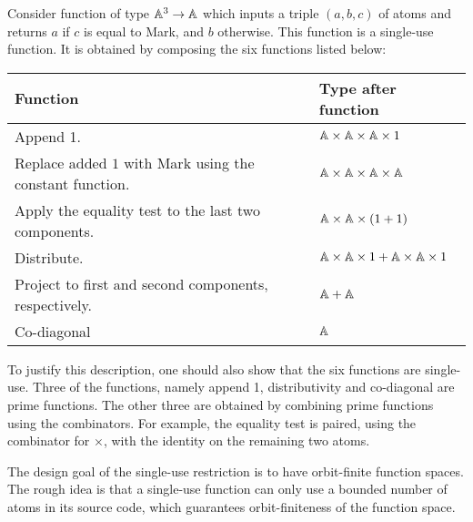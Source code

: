 \begin{example}\label{ex:six-compositions}
    Consider function of type $\mathbb A^3 \to \mathbb A$ which inputs a triple $(a,b,c)$ of atoms and returns $a$ if $c$ is equal to Mark, and $b$ otherwise. This function is a single-use function. It is obtained by composing the six functions listed below:
\begin{center}
    \begin{tabular}{ll}
        Function & Type after function \\
        \hline
        Append 1. & $ \mathbb A \times \mathbb A \times \mathbb A \times 1$ \\
        Replace added $1$ with Mark using the constant function. & $\mathbb A \times \mathbb A \times \mathbb A \times \mathbb A$ \\
        Apply the equality test to the last two components. & $ \mathbb A \times \mathbb A \times (1+1)$ \\
        Distribute. & $ \mathbb A \times \mathbb A \times 1 +   \mathbb A \times \mathbb A \times 1$ \\
        Project to first and second components, respectively. & $\mathbb A + \mathbb A$ \\
        Co-diagonal & $\mathbb A$ 
    \end{tabular}
\end{center}
To justify this description, one should also show that the six functions are single-use. Three of the functions, namely append 1, distributivity and co-diagonal are prime functions. The other three are obtained by combining prime functions using the combinators. For example, the equality test is paired, using the combinator for $\times$, with the identity on the remaining two atoms. 
\end{example}

The design goal of the single-use restriction is to have orbit-finite function spaces. The rough idea is that a single-use function can only use a bounded number of atoms in its source code, which guarantees orbit-finiteness of the function space. 

